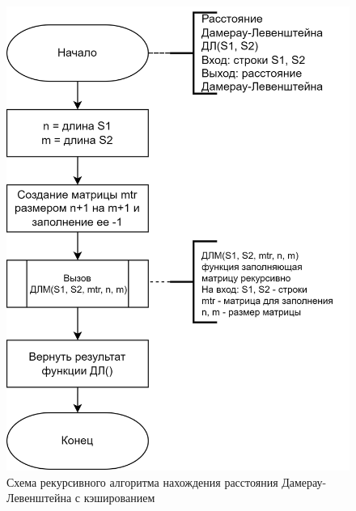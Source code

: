 \documentclass[a4paper,14pt, unknownkeysallowed]{bmstu}
\begin{document}
\begin{figure}[h]
	\centering
	\includegraphics[height=0.6\textheight]{img/dlrechash-1.png}
	\caption{Схема рекурсивного алгоритма нахождения расстояния Дамерау-Левенштейна с кэшированием}
	\label{fig:DLrechash1}
\end{figure}

\clearpage
\end{document}

